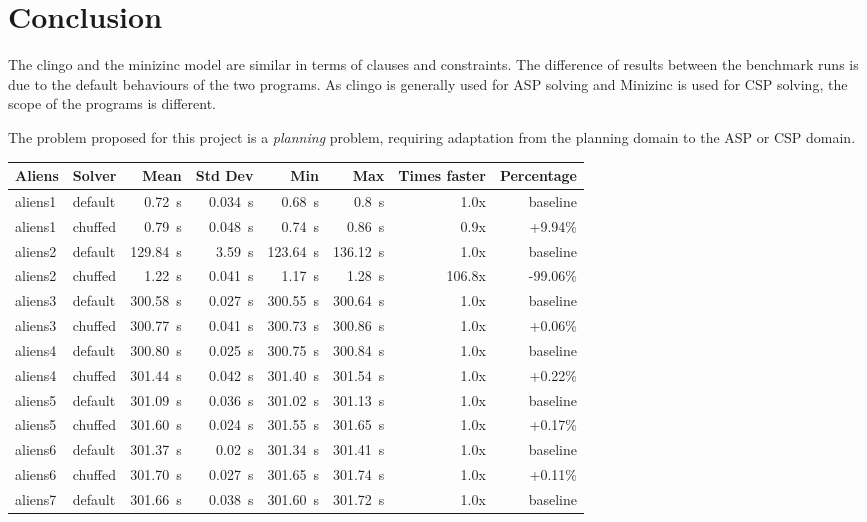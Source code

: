 \documentclass[11pt]{article}
\begin{document}
\section{Conclusion}
The clingo and the minizinc model are similar in terms of clauses and constraints.
The difference of results between the benchmark runs is due to the default behaviours of the two programs.
As clingo is generally used for ASP solving and Minizinc is used for CSP solving, the scope of the programs is different.

The problem proposed for this project is a \textit{planning} problem, requiring adaptation from the planning domain to the ASP or CSP domain.

\begin{table}[h]
  \centering
  \begin{tabular}{|llrrrrrr|}
    \hline
    Aliens & Solver & Mean & Std Dev & Min & Max & Times faster & Percentage \\
    \hline
    aliens1 & default & 0.72~s & 0.034~s & 0.68~s & 0.8~s & 1.0x & baseline \\
    aliens1 & chuffed & 0.79~s & 0.048~s & 0.74~s & 0.86~s & 0.9x & +9.94\% \\
    \hline
    aliens2 & default & 129.84~s & 3.59~s & 123.64~s & 136.12~s & 1.0x & baseline \\
    aliens2 & chuffed & 1.22~s & 0.041~s & 1.17~s & 1.28~s & 106.8x & -99.06\% \\
    \hline
    aliens3 & default & 300.58~s & 0.027~s & 300.55~s & 300.64~s & 1.0x & baseline \\
    aliens3 & chuffed & 300.77~s & 0.041~s & 300.73~s & 300.86~s & 1.0x & +0.06\% \\
    \hline
    aliens4 & default & 300.80~s & 0.025~s & 300.75~s & 300.84~s & 1.0x & baseline \\
    aliens4 & chuffed & 301.44~s & 0.042~s & 301.40~s & 301.54~s & 1.0x & +0.22\% \\
    \hline
    aliens5 & default & 301.09~s & 0.036~s & 301.02~s & 301.13~s & 1.0x & baseline \\
    aliens5 & chuffed & 301.60~s & 0.024~s & 301.55~s & 301.65~s & 1.0x & +0.17\% \\
    \hline
    aliens6 & default & 301.37~s & 0.02~s & 301.34~s & 301.41~s & 1.0x & baseline \\
    aliens6 & chuffed & 301.70~s & 0.027~s & 301.65~s & 301.74~s & 1.0x & +0.11\% \\
    \hline
    aliens7 & default & 301.66~s & 0.038~s & 301.60~s & 301.72~s & 1.0x & baseline \\

\end{tabular}
\end{table}
\end{document}
